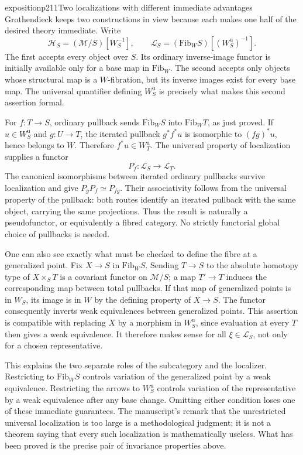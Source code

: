 \begin{dcomment}{exposition}{p211}{Two localizations with different immediate advantages}
Grothendieck keeps two constructions in view because each makes one half of the desired theory immediate. Write
\[
 \mathcal H_S=(\mathcal M/S)[W_S^{-1}],\qquad
 \mathcal L_S=(\mathrm{Fib}_W S)[(W_S^{\mathrm u})^{-1}].
\]
The first accepts every object over $S$. Its ordinary inverse-image functor is initially available only for a base map in $\mathrm{Fib}_W$. The second accepts only objects whose structural map is a $W$-fibration, but its inverse images exist for every base map. The universal quantifier defining $W_S^{\mathrm u}$ is precisely what makes this second assertion formal.

For $f:T\to S$, ordinary pullback sends $\mathrm{Fib}_W S$ into $\mathrm{Fib}_W T$, as just proved. If $u\in W_S^{\mathrm u}$ and $g:U\to T$, the iterated pullback $g^*f^*u$ is isomorphic to $(fg)^*u$, hence belongs to $W$. Therefore $f^*u\in W_T^{\mathrm u}$. The universal property of localization supplies a functor
\[
 P_f:\mathcal L_S\longrightarrow\mathcal L_T.
\]
The canonical isomorphisms between iterated ordinary pullbacks survive localization and give $P_gP_f\simeq P_{fg}$. Their associativity follows from the universal property of the pullback: both routes identify an iterated pullback with the same object, carrying the same projections. Thus the result is naturally a pseudofunctor, or equivalently a fibred category. No strictly functorial global choice of pullbacks is needed.

One can also see exactly what must be checked to define the fibre at a generalized point. Fix $X\to S$ in $\mathrm{Fib}_W S$. Sending $T\to S$ to the absolute homotopy type of $X\times_S T$ is a covariant functor on $\mathcal M/S$; a map $T'\to T$ induces the corresponding map between total pullbacks. If that map of generalized points is in $W_S$, its image is in $W$ by the defining property of $X\to S$. The functor consequently inverts weak equivalences between generalized points. This assertion is compatible with replacing $X$ by a morphism in $W_S^{\mathrm u}$, since evaluation at every $T$ then gives a weak equivalence. It therefore makes sense for all $\xi\in\mathcal L_S$, not only for a chosen representative.

This explains the two separate roles of the subcategory and the localizer. Restricting to $\mathrm{Fib}_W S$ controls variation of the generalized point by a weak equivalence. Restricting the arrows to $W_S^{\mathrm u}$ controls variation of the representative by a weak equivalence after any base change. Omitting either condition loses one of these immediate guarantees. The manuscript's remark that the unrestricted universal localization is too large is a methodological judgment; it is not a theorem saying that every such localization is mathematically useless. What has been proved is the precise pair of invariance properties above.
\end{dcomment}

